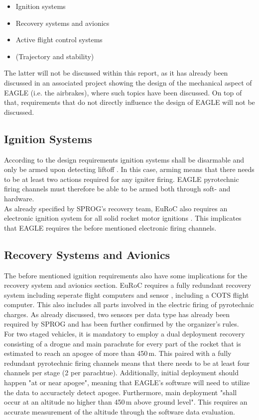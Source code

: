 \documentclass[fontsize=11pt,%
twoside,%
BCOR          = 8mm, %
DIV           = 11,  %
titlepage     = off,%
index=totoc,%
xcolor        = pdftex,%
dvipsnames,%
bibliography  = totoc,%
bibliography = numbered, %
listof        = notnumbered]{scrreprt}
\begin{document}
\begin{itemize}
	\item Ignition systems
	\item Recovery systems and avionics
	\item Active flight control systems
	\item (Trajectory and stability)
\end{itemize}

The latter will not be discussed within this report, as it has already been discussed in an associated project showing the design of the mechanical aspect of EAGLE (i.e. the airbrakes\cite{EAGLE}), where such topics have been discussed. On top of that, requirements that do not directly influence the design of EAGLE will not be discussed.

\subsection{Ignition Systems}
According to the design requirements ignition systems shall be disarmable and only be armed upon detecting liftoff \cite[p.~16]{EurocRules}. In this case, arming means that there needs to be at least two actions required for any igniter firing. EAGLE pyrotechnic firing channels must therefore be able to be armed both through soft- and hardware.\\
As already specified by SPROG's recovery team, EuRoC also requires an electronic ignition system for all solid rocket motor ignitions \cite[p.~15]{EurocRules}. This implicates that EAGLE requires the before mentioned electronic firing channels.  

\subsection{Recovery Systems and Avionics}
The before mentioned ignition requirements also have some implications for the recovery system and avionics section. EuRoC requires a fully redundant recovery system including seperate flight computers and sensor \cite[p.~24]{EurocRules}, including a COTS flight computer. This also includes all parts involved in the electric firing of pyrotechnic charges. As already discussed, two sensors per data type has already been required by SPROG and has been further confirmed by the organizer's rules.\\
For two staged vehicles, it is mandatory to employ a dual deployment recovery consisting of a drogue and main parachute \cite[p.~28]{EurocRules} for every part of the rocket that is estimated to reach an apogee of more than 450\,m. This paired with a fully redundant pyrotechnic firing channels means that there needs to be at least four channels per stage (2 per parachtue). Additionally, initial deployment should happen "at or near apogee"\cite[p.~28]{EurocRules}, meaning that EAGLE's software will need to utilize the data to accuractely detect apogee. Furthermore, main deployment "shall occur at an altitude no higher than 450\,m above ground level"\cite[p.~29]{EurocRules}. This requires an accurate measurement of the altitude through the software data evaluation.
\end{document}
